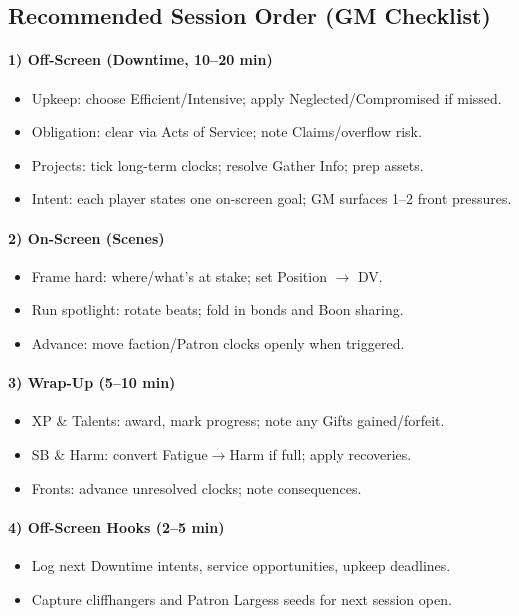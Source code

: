 \subsection{Recommended Session Order (GM Checklist)}

\paragraph{1) Off-Screen (Downtime, 10–20 min)}
\begin{itemize}
  \item Upkeep: choose Efficient/Intensive; apply Neglected/Compromised if missed.
  \item Obligation: clear via Acts of Service; note Claims/overflow risk.
  \item Projects: tick long-term clocks; resolve Gather Info; prep assets.
  \item Intent: each player states one on-screen goal; GM surfaces 1–2 front pressures.
\end{itemize}

\paragraph{2) On-Screen (Scenes)}
\begin{itemize}
  \item Frame hard: where/what’s at stake; set Position $\to$ DV.
  \item Run spotlight: rotate beats; fold in bonds and Boon sharing.
  \item Advance: move faction/Patron clocks openly when triggered.
\end{itemize}

\paragraph{3) Wrap-Up (5–10 min)}
\begin{itemize}
  \item XP \& Talents: award, mark progress; note any Gifts gained/forfeit.
  \item SB \& Harm: convert Fatigue$\to$Harm if full; apply recoveries.
  \item Fronts: advance unresolved clocks; note consequences.
\end{itemize}

\paragraph{4) Off-Screen Hooks (2–5 min)}
\begin{itemize}
  \item Log next Downtime intents, service opportunities, upkeep deadlines.
  \item Capture cliffhangers and Patron Largess seeds for next session open.
\end{itemize}

